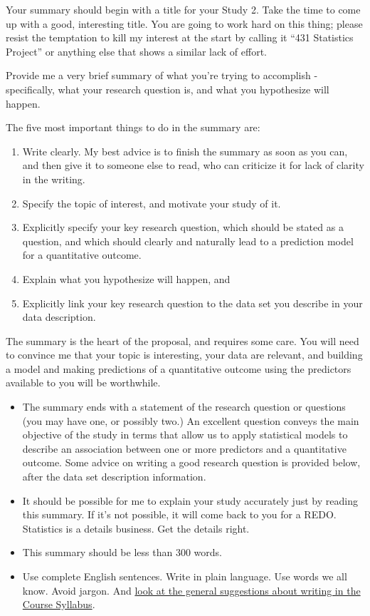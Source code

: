 \documentclass[]{book}
\providecommand{\tightlist}{%
  \setlength{\itemsep}{0pt}\setlength{\parskip}{0pt}}
\theoremstyle{definition}
\theoremstyle{definition}
\theoremstyle{definition}
\theoremstyle{remark}
\begin{document}
Your summary should begin with a title for your Study 2. Take the time
to come up with a good, interesting title. You are going to work hard on
this thing; please resist the temptation to kill my interest at the
start by calling it ``431 Statistics Project'' or anything else that
shows a similar lack of effort.

Provide me a very brief summary of what you're trying to accomplish -
specifically, what your research question is, and what you hypothesize
will happen.

The five most important things to do in the summary are:

\begin{enumerate}
\def\labelenumi{\arabic{enumi}.}
\tightlist
\item
  Write clearly. My best advice is to finish the summary as soon as you
  can, and then give it to someone else to read, who can criticize it
  for lack of clarity in the writing.
\item
  Specify the topic of interest, and motivate your study of it.
\item
  Explicitly specify your key research question, which should be stated
  as a question, and which should clearly and naturally lead to a
  prediction model for a quantitative outcome.
\item
  Explain what you hypothesize will happen, and
\item
  Explicitly link your key research question to the data set you
  describe in your data description.
\end{enumerate}

The summary is the heart of the proposal, and requires some care. You
will need to convince me that your topic is interesting, your data are
relevant, and building a model and making predictions of a quantitative
outcome using the predictors available to you will be worthwhile.

\begin{itemize}
\tightlist
\item
  The summary ends with a statement of the research question or
  questions (you may have one, or possibly two.) An excellent question
  conveys the main objective of the study in terms that allow us to
  apply statistical models to describe an association between one or
  more predictors and a quantitative outcome. Some advice on writing a
  good research question is provided below, after the data set
  description information.
\item
  It should be possible for me to explain your study accurately just by
  reading this summary. If it's not possible, it will come back to you
  for a REDO. Statistics is a details business. Get the details right.
\item
  This summary should be less than 300 words.
\item
  Use complete English sentences. Write in plain language. Use words we
  all know. Avoid jargon. And
  \href{https://thomaselove.github.io/2018-431-syllabus/a-few-general-writingpresenting-tips.html}{look
  at the general suggestions about writing in the Course Syllabus}.
\end{itemize}
\end{document}
